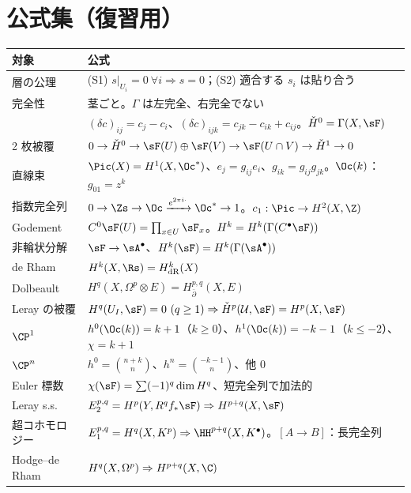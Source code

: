 \section*{公式集（復習用）}
\begin{center}
\renewcommand{\arraystretch}{1.35}
\begin{tabular}{p{}p{}}
\toprule
対象 & 公式\\
\midrule
層の公理 & (S1) $s|_{U_i}=0\ \forall i\Rightarrow s=0$；(S2) 適合する $s_i$ は貼り合う\\
完全性 & 茎ごと。$\Gamma$ は左完全、右完全でない\\
\Cech{} & $(\delta c)_{ij}=c_j-c_i$、$(\delta c)_{ijk}=c_{jk}-c_{ik}+c_{ij}$。$\check H^0=\Gamma(X,\sF)$\\
2 枚被覆 & $0\to\check H^0\to\sF(U)\oplus\sF(V)\to\sF(U\cap V)\to\check H^1\to0$\\
直線束 & $\Pic(X)=H^1(X,\Oc^*)$、$e_j=g_{ij}e_i$、$g_{ik}=g_{ij}g_{jk}$。$\Oc(k)$：$g_{01}=z^k$\\
指数完全列 & $0\to\Zs\to\Oc\xrightarrow{e^{2\pi i\cdot}}\Oc^*\to1$。$c_1:\Pic\to H^2(X,\Z)$\\
Godement & $C^0\sF(U)=\prod_{x\in U}\sF_x$。$H^k=H^k(\Gamma(C^\bullet\sF))$\\
非輪状分解 & $\sF\to\sA^\bullet$、$H^k(\sF)=H^k(\Gamma(\sA^\bullet))$\\
de Rham & $H^k(X,\Rs)=H^k_{\mathrm{dR}}(X)$\\
Dolbeault & $H^q(X,\Omega^p\otimes E)=H^{p,q}_{\bar\partial}(X,E)$\\
Leray の被覆 & $H^q(U_I,\sF)=0\ (q\ge1)\Rightarrow\check H^p(\mathcal U,\sF)=H^p(X,\sF)$\\
$\CP^1$ & $h^0(\Oc(k))=k+1$（$k\ge0$）、$h^1(\Oc(k))=-k-1$（$k\le-2$）、$\chi=k+1$\\
$\CP^n$ & $h^0=\binom{n+k}n$、$h^n=\binom{-k-1}n$、他 $0$\\
Euler 標数 & $\chi(\sF)=\sum(-1)^q\dim H^q$、短完全列で加法的\\
Leray s.s. & $E_2^{p,q}=H^p(Y,R^qf_*\sF)\Rightarrow H^{p+q}(X,\sF)$\\
超コホモロジー & $E_1^{p,q}=H^q(X,K^p)\Rightarrow\HH^{p+q}(X,K^\bullet)$。$[A\to B]$：長完全列\\
Hodge--de Rham & $H^q(X,\Omega^p)\Rightarrow H^{p+q}(X,\C)$\\
\bottomrule
\end{tabular}
\end{center}

